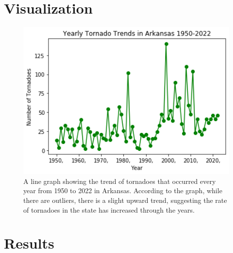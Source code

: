 \documentclass[12 pt., oneside, letterpaper]{article}
\begin{document}
\section{Visualization}
\begin{center}
\begin{figure}[h]
\includegraphics[width=1.0\textwidth]{graph}
\caption{A line graph showing the trend of tornadoes that occurred every year from 1950 to 2022 in Arkansas. 
         According to the graph, while there are outliers, there is a slight upward trend, suggesting the rate of tornadoes in the state has increased through the years.\cite{record_tornadoes}}
\label{fig:graph}
\end{figure}
\end{center}

\section{Results}



\end{document}
